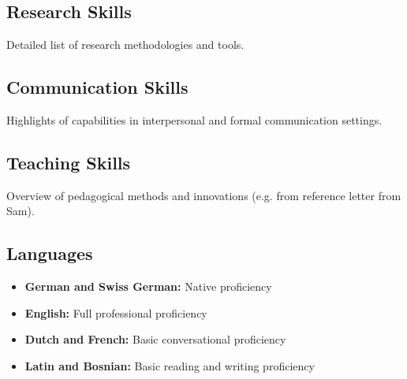 \subsection{Research Skills}
Detailed list of research methodologies and tools.

\subsection{Communication Skills}
Highlights of capabilities in interpersonal and formal communication settings.

\subsection{Teaching Skills}
Overview of pedagogical methods and innovations (e.g. from reference letter from Sam).

\subsection{Languages}
\begin{itemize}
  \item \textbf{German and Swiss German:} Native proficiency
  \item \textbf{English:} Full professional proficiency
  \item \textbf{Dutch and French:} Basic conversational proficiency
  \item \textbf{Latin and Bosnian:} Basic reading and writing proficiency
\end{itemize}